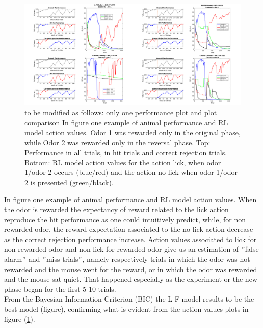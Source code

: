 \begin{figure}[ht!]
    \includegraphics[scale=0.3]{figures/ResumeRLPerf.png}
    \caption{{\color{red} to be modified as follows: only one performance plot and plot comparison} In figure one example of animal performance and RL model action values.
    Odor 1 was rewarded only in the original phase, while Odor 2 was rewarded only in the reversal phase. Top: Performance in all trials, in hit trials and correct rejection trials. Bottom: RL model action values for the action lick, when odor 1/odor 2 occurs (blue/red) and the action no lick when odor 1/odor 2 is presented (green/black). %
    }
    \label{fig:PerfRL}
\end{figure}
In figure one example of animal performance and RL model action values. When the odor is rewarded the expectancy of reward related to the lick action reproduce the hit performance as one could intuitively predict, while, for non rewarded odor, the reward expectation associated to the no-lick action decrease as the correct rejection performance increase. Action values associated to lick for non rewarded odor and non-lick for rewarded odor give us an estimation of $"$false alarm$"$ and $"$miss trials$"$, namely respectively trials in which the odor was not rewarded and the mouse went for the reward, or in which the odor was rewarded and the mouse sat quiet. That happened especially as the experiment or the new phase began for the first 5-10 trials.\\
From the Bayesian Information Criterion (BIC) the L-F model results to be the best model (figure), confirming what is evident from the action values plots in figure (\ref{fig:PerfRL}).

